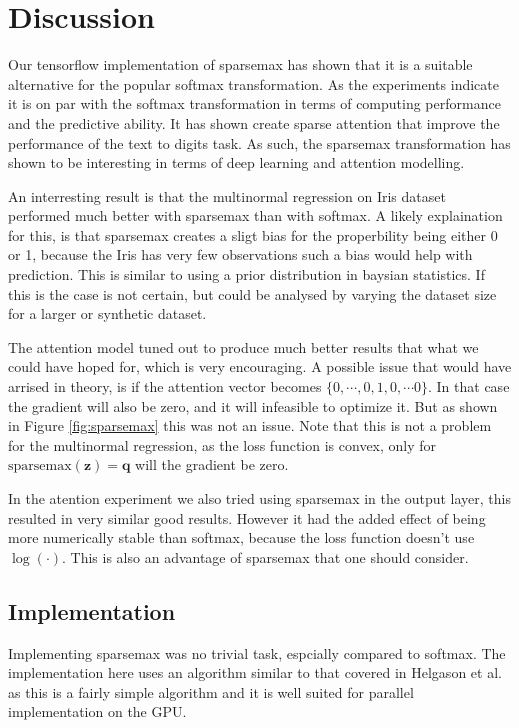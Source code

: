 \section{Discussion}
Our tensorflow implementation of sparsemax has shown that it is a suitable alternative for the popular softmax transformation. As the experiments indicate it is on par with the softmax transformation in terms of computing performance and the predictive ability.
It has shown create sparse attention that improve the performance of the text to digits task. As such, the sparsemax transformation has shown to be interesting in terms of deep learning and attention modelling.

An interresting result is that the multinormal regression on Iris dataset performed much better with sparsemax than with softmax. A likely explaination for this, is that sparsemax creates a sligt bias for the properbility being either 0 or 1, because the Iris has very few observations such a bias would help with prediction. This is similar to using a prior distribution in baysian statistics. If this is the case is not certain, but could be analysed by varying the dataset size for a larger or synthetic dataset.

The attention model tuned out to produce much better results that what we could have hoped for, which is very encouraging. A possible issue that would have arrised in theory, is if the attention vector becomes $\{0, \cdots, 0, 1, 0, \cdots 0\}$. In that case the gradient will also be zero, and it will infeasible to optimize it. But as shown in Figure \ref{fig:sparsemax} this was not an issue. Note that this is not a problem for the multinormal regression, as the loss function is convex, only for $\mathrm{sparsemax}(\mathbf{z}) = \mathbf{q}$ will the gradient be zero.

In the atention experiment we also tried using sparsemax in the output layer, this resulted in very similar good results. However it had the added effect of being more numerically stable than softmax, because the loss function doesn't use $\log(\cdot)$. This is also an advantage of sparsemax that one should consider.

\subsection{Implementation}
Implementing sparsemax was no trivial task, espcially compared to softmax. The implementation here uses an algorithm similar to that covered in Helgason et al. \cite{Helgason1980} as this is a fairly simple algorithm and it is well suited for parallel implementation on the GPU.

